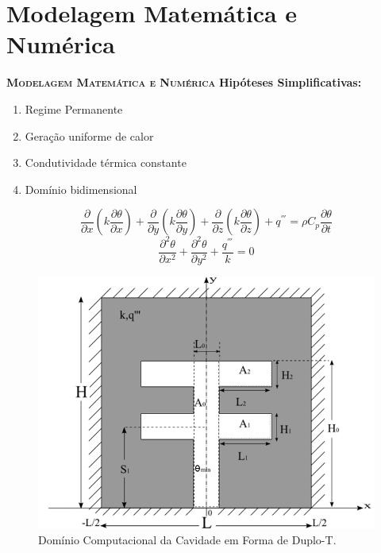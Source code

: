 \documentclass[xcolor=dvipsnames,10pt]{beamer}
\begin{document}
\section{Modelagem Matemática e Numérica}
\begin{frame}{}
\begin{block}{\textbf{\textsc{Modelagem Matemática e Numérica}}}
		\textbf{Hipóteses Simplificativas:}
		\begin{enumerate}
			\item Regime Permanente
			\item Geração uniforme de calor
			\item Condutividade térmica constante
			\item Domínio bidimensional
		\end{enumerate}
	
		\begin{equation}
		\frac{\partial}{\partial x}\left( k\frac{\partial \theta}{\partial x}\right)+
		\frac{\partial}{\partial y}\left(k\frac{\partial \theta}{\partial y}\right)+
		\frac{\partial}{\partial z}\left(k\frac{\partial \theta}{\partial z}\right)+ 
		q^{'''}=\rho C_p\frac{\partial \theta}{\partial t}\label{calor}
		\end{equation}
		\begin{equation}
		\frac{\partial ^{2} \theta}{\partial x^{2}}+\frac{\partial ^{2} \theta}{\partial y^{2}}+\frac{q^{'''}}{k}=0\label{calor}
		\end{equation}
	\end{block} 
\end{frame}
\begin{frame}
\begin{figure}[h!]
			\centering
			\includegraphics[width=0.66\linewidth]{../../imgs/duplo_t.png}
			\caption{ {\small Domínio Computacional da Cavidade em Forma de Duplo-T.}}
			\label{figure01}
		\end{figure}
\end{frame}
\end{document}
